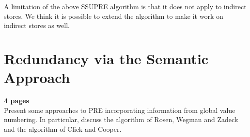 A limitation of the above SSUPRE algorithm is that it does not apply to 
indirect stores.  We think it is possible to extend the algorithm to make it
work on indirect stores as well.

\section{Redundancy via the Semantic Approach}
\label{section:Part3:Pre_not_helped:SemanticPRE}
{\bf 4 pages} \\
Present some approaches to PRE incorporating information from global 
value numbering. In particular, discuss the  algorithm of Rosen, Wegman and 
 Zadeck and the algorithm of Click and Cooper. 


